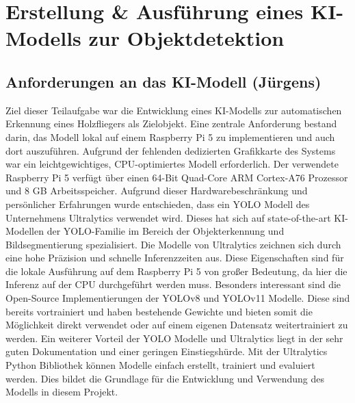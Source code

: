 \chapter{Erstellung \& Ausführung eines KI-Modells zur Objektdetektion} \label{sec:ai_model}
\section{Anforderungen an das KI-Modell (Jürgens)}
Ziel dieser Teilaufgabe war die Entwicklung eines KI-Modells zur automatischen Erkennung eines Holzfliegers als Zielobjekt. Eine zentrale Anforderung bestand darin, das Modell lokal auf einem Raspberry Pi 5 zu implementieren und auch dort auszuführen. Aufgrund der fehlenden dedizierten Grafikkarte des Systems war ein leichtgewichtiges, CPU-optimiertes Modell erforderlich. Der verwendete Raspberry Pi 5 verfügt über einen 64-Bit Quad-Core ARM Cortex-A76 Prozessor und 8 GB Arbeitsspeicher. \cite{raspberrypi5website} 
Aufgrund dieser Hardwarebeschränkung und persönlicher Erfahrungen wurde entschieden, dass ein YOLO Modell des Unternehmens Ultralytics verwendet wird. Dieses hat sich auf state-of-the-art KI-Modellen der YOLO-Familie im Bereich der Objekterkennung und Bildsegmentierung spezialisiert. \cite{ultralyticsFAQ} Die Modelle von Ultralytics zeichnen sich durch eine hohe Präzision und schnelle Inferenzzeiten aus. Diese Eigenschaften sind für die lokale Ausführung auf dem Raspberry Pi 5 von großer Bedeutung, da hier die Inferenz auf der CPU durchgeführt werden muss. 
Besonders interessant sind die Open-Source Implementierungen der YOLOv8 und YOLOv11 Modelle. Diese sind bereits vortrainiert und haben bestehende Gewichte und bieten somit die Möglichkeit direkt verwendet oder auf einem eigenen Datensatz weitertrainiert zu werden. Ein weiterer Vorteil der YOLO Modelle und Ultralytics liegt in der sehr guten Dokumentation und einer geringen Einstiegshürde. Mit der Ultralytics Python Bibliothek können Modelle einfach erstellt, trainiert und evaluiert werden. Dies bildet die Grundlage für die Entwicklung und Verwendung des Modells in diesem Projekt.



